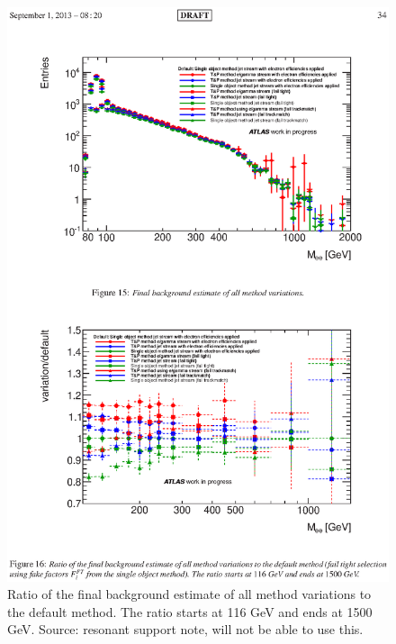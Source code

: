    \begin{figure}[h]
      \begin{center}
      \includegraphics[scale=1,trim={3cm 5.5cm 3cm 14cm},clip]{images/ff_bkg_variation.ps}
      \end{center}
   \caption{Ratio of the final background estimate of all method variations to the default method. The ratio starts at 116 GeV and ends at 1500 GeV. Source: resonant support note, will not be able to use this.}
   \label{fig:ff_bkg_variation}
   \end{figure}












